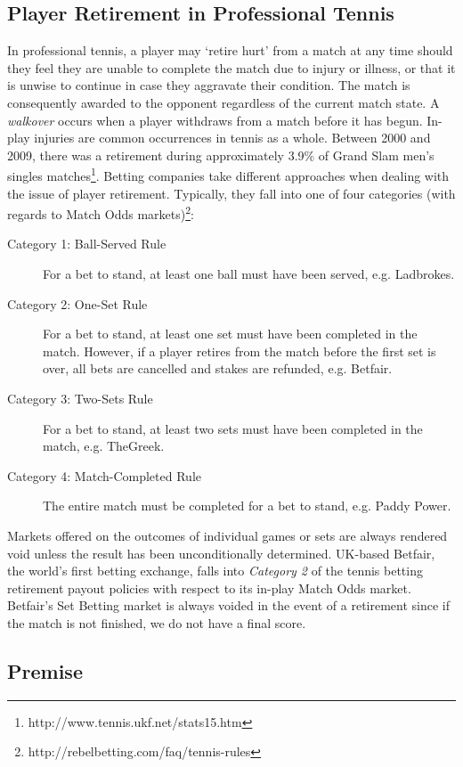 \documentclass[authoryear, 12pt]{elsarticle}
\begin{document}
\subsection{Player Retirement in Professional Tennis}

In professional tennis, a player may `retire hurt' from a match at any time should they feel they are unable to complete the match due to injury or illness, or that it is unwise to continue in case they aggravate their condition.  The match is consequently awarded to the opponent regardless of the current match state.  A \textit{walkover} occurs when a player withdraws from a match before it has begun.  In-play injuries are common occurrences in tennis as a whole.  Between 2000 and 2009, there was a retirement during approximately 3.9\% of Grand Slam men's singles matches\footnote{http://www.tennis.ukf.net/stats15.htm}.  Betting companies take different approaches when dealing with the issue of player retirement.  Typically, they fall into one of four categories (with regards to Match Odds markets)\footnote{http://rebelbetting.com/faq/tennis-rules}:

\begin{description}
	\item[Category 1: Ball-Served Rule] For a bet to stand, at least one ball must have been served, e.g. Ladbrokes.
	\item[Category 2: One-Set Rule] For a bet to stand, at least one set must have been completed in the match.  However, if a player retires from the match before the first set is over, all bets are cancelled and stakes are refunded, e.g. Betfair.
	\item[Category 3: Two-Sets Rule] For a bet to stand, at least two sets must have been completed in the match, e.g. TheGreek.
	\item[Category 4: Match-Completed Rule] The entire match must be completed for a bet to stand, e.g. Paddy Power.
\end{description}

Markets offered on the outcomes of individual games or sets are always rendered void unless the result has been unconditionally determined.  UK-based Betfair, the world's first betting exchange, falls into \textit{Category 2} of the tennis betting retirement payout policies with respect to its in-play Match Odds market.  Betfair's Set Betting market is always voided in the event of a retirement since if the match is not finished, we do not have a final score.

\subsection{Premise}
\end{document}
